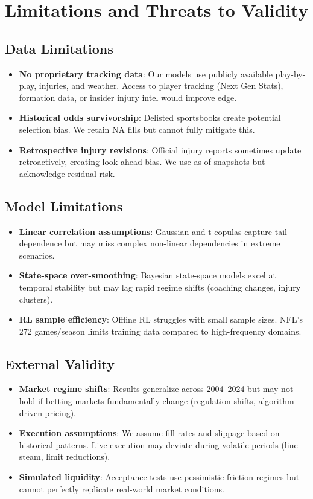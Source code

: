 \section{Limitations and Threats to Validity}

\subsection{Data Limitations}
\begin{itemize}
  \item \textbf{No proprietary tracking data}: Our models use publicly available play-by-play, injuries, and weather. Access to player tracking (Next Gen Stats), formation data, or insider injury intel would improve edge.
  \item \textbf{Historical odds survivorship}: Delisted sportsbooks create potential selection bias. We retain NA fills but cannot fully mitigate this.
  \item \textbf{Retrospective injury revisions}: Official injury reports sometimes update retroactively, creating look-ahead bias. We use as-of snapshots but acknowledge residual risk.
\end{itemize}

\subsection{Model Limitations}
\begin{itemize}
  \item \textbf{Linear correlation assumptions}: Gaussian and t-copulas capture tail dependence but may miss complex non-linear dependencies in extreme scenarios.
  \item \textbf{State-space over-smoothing}: Bayesian state-space models excel at temporal stability but may lag rapid regime shifts (coaching changes, injury clusters).
  \item \textbf{RL sample efficiency}: Offline RL struggles with small sample sizes. NFL's 272 games/season limits training data compared to high-frequency domains.
\end{itemize}

\subsection{External Validity}
\begin{itemize}
  \item \textbf{Market regime shifts}: Results generalize across 2004--2024 but may not hold if betting markets fundamentally change (regulation shifts, algorithm-driven pricing).
  \item \textbf{Execution assumptions}: We assume fill rates and slippage based on historical patterns. Live execution may deviate during volatile periods (line steam, limit reductions).
  \item \textbf{Simulated liquidity}: Acceptance tests use pessimistic friction regimes but cannot perfectly replicate real-world market conditions.
\end{itemize}

